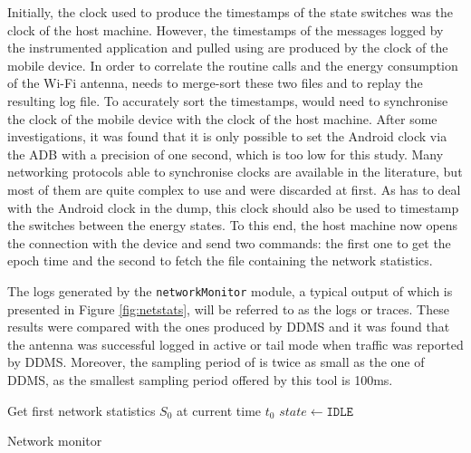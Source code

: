 Initially, the clock used to produce the timestamps of the state 
switches was the clock of the host machine. However, the timestamps of 
the messages logged by the instrumented application and pulled using 
\logcat{} are produced by the clock of the mobile device. In order to 
correlate the routine calls and the energy consumption of the Wi-Fi 
antenna, \Orka{} needs to merge-sort these two files and to replay the 
resulting log file. To accurately sort the timestamps, \Orka{} would 
need to synchronise the clock of the mobile device with the clock of the 
host machine. After some investigations, it was found that it is only 
possible to set the Android clock via the ADB with a precision of one 
second, which is too low for this study. Many networking protocols able 
to synchronise clocks are available in the literature, but most of them 
are quite complex to use and were discarded at first. As \Orka{} has to 
deal with the Android clock in the \logcat{} dump, this clock should 
also be used to timestamp the switches between the energy states. To 
this end, the host machine now opens the connection with the device and 
send two commands: the first one to get the epoch time and the second to 
fetch the file containing the network statistics.

The logs generated by the \texttt{networkMonitor} module, a typical 
output of which is presented in Figure \ref{fig:netstats}, will be 
referred to as the \netstats{} logs or traces. These results were 
compared with the ones produced by DDMS and it was found that the 
antenna was successful logged in active or tail mode when traffic was 
reported by DDMS. Moreover, the sampling period of \Orka{} is twice as 
small as the one of DDMS, as the smallest sampling period offered by 
this tool is 100ms.


\begin{algorithm}
Get first network statistics $S_0$ at current time $t_0$\;
$state \leftarrow \texttt{IDLE}$\;
\caption{Network monitor}
\label{alg:netmonitor}
\end{algorithm}

